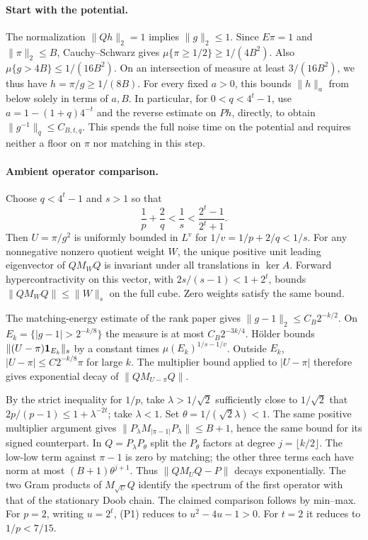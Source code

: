 \paragraph{Start with the potential.}
The normalization $\|Qh\|_2=1$ implies $\|g\|_2\le1$. Since $E\pi=1$
and $\|\pi\|_2\le B$, Cauchy--Schwarz gives
$\mu\{\pi\ge1/2\}\ge1/(4B^2)$. Also $\mu\{g>4B\}\le1/(16B^2)$.
On an intersection of measure at least $3/(16B^2)$, we thus have
$h=\pi/g\ge1/(8B)$. For every fixed $a>0$, this bounds $\|h\|_a$
from below solely in terms of $a,B$. In particular, for $0<q<4^t-1$,
use $a=1-(1+q)4^{-t}$ and the reverse estimate on $Ph$, directly, to obtain
$\|g^{-1}\|_q\le C_{B,t,q}$. This spends the full noise time on the
potential and requires neither a floor on $\pi$ nor matching in this step.

\paragraph{Ambient operator comparison.}
Choose $q<4^t-1$ and $s>1$ so that
\[
 \frac1p+\frac2q<\frac1s<\frac{2^t-1}{2^t+1}.
\]
Then $U=\pi/g^2$ is uniformly bounded in $L^v$ for
$1/v=1/p+2/q<1/s$. For any nonnegative nonzero quotient weight $W$,
the unique positive unit leading eigenvector of $Q M_W Q$ is invariant
under all translations in $\ker A$. Forward hypercontractivity on this
vector, with $2s/(s-1)<1+2^t$, bounds $\|Q M_W Q\|\le\|W\|_s$
on the full cube. Zero weights satisfy the same bound.

The matching-energy estimate of the rank paper gives
$\|g-1\|_2\le C_B2^{-k/2}$. On
$E_k=\{|g-1|>2^{-k/8}\}$ the measure is at most $C_B2^{-3k/4}$.
H\"older bounds $\|(U-\pi){\bf1}_{E_k}\|_s$ by a constant times
$\mu(E_k)^{1/s-1/v}$. Outside $E_k$, $|U-\pi|\le C2^{-k/8}\pi$
for large $k$. The multiplier bound applied to $|U-\pi|$ therefore
gives exponential decay of $\|Q M_{U-\pi}Q\|$.

By the strict inequality for $1/p$, take $\lambda>1/\sqrt2$ sufficiently
close to $1/\sqrt2$ that $2p/(p-1)\le 1+\lambda^{-2t}$; take $\lambda<1$.
Set $\theta=1/(\sqrt2\lambda)<1$. The same positive multiplier argument
gives $\|P_\lambda M_{|\pi-1|}P_\lambda\|\le B+1$, hence the same
bound for its signed counterpart. In $Q=P_\lambda P_\theta$ split the
$P_\theta$ factors at degree $j=\lfloor k/2\rfloor$. The low-low term
against $\pi-1$ is zero by matching; the other three terms each have norm
at most $(B+1)\theta^{j+1}$. Thus $\|QM_UQ-P\|$ decays exponentially.
The two Gram products of $M_{\sqrt U}Q$ identify the spectrum of the
first operator with that of the stationary Doob chain. The claimed
comparison follows by min--max. For $p=2$, writing $u=2^t$, (P1)
reduces to $u^2-4u-1>0$. For $t=2$ it reduces to $1/p<7/15$.

